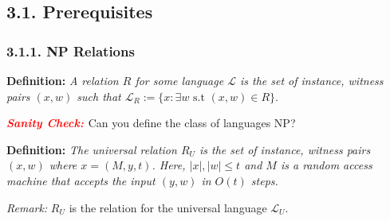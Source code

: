 \documentclass{article}
\newcommand{\scheck}{\textbf{\textit{\textcolor{red}{Sanity Check: }}}}
\begin{document}
\subsection*{3.1. Prerequisites}

\subsubsection*{3.1.1. NP Relations}
\textbf{Definition:} \textit{A relation $R$ for some language $\mathcal{L}$ is the set of instance, witness pairs $(x, w)$ such that $\mathcal{L}_{R} := \{x : \exists w \text{ s.t } (x, w) \in R\}$}.

\scheck Can you define the class of languages \textsc{NP}?

\textbf{Definition:} \textit{The universal relation $R_U$ is the set of instance, witness pairs $(x, w)$ where $x = (M, y, t)$. Here, $|x|, |w| \leq t$ and $M$ is a random access machine that accepts the input $(y, w)$ in $O(t)$ steps.}

\textit{Remark: } $R_U$ is the relation for the universal language $\mathcal{L}_U$.
\end{document}

